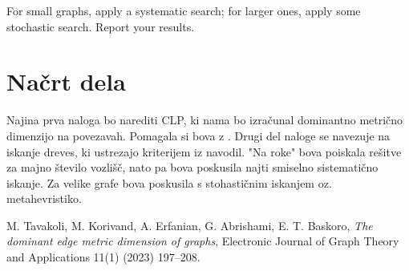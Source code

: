 \documentclass[a4paper,12pt]{article}
\begin{document}
    For small graphs, apply a systematic search; for larger ones, apply some stochastic search. Report your results.

\section{Načrt dela}
    Najina prva naloga bo narediti CLP, ki nama bo izračunal dominantno metrično dimenzijo na povezavah. Pomagala si bova z \cite{dominantedge}. Drugi del naloge se navezuje na iskanje dreves, ki ustrezajo kriterijem iz navodil. "Na roke" bova poiskala rešitve za majno število vozlišč, nato pa bova poskusila najti smiselno sistematično iskanje. Za velike grafe bova poskusila s stohastičnim iskanjem oz. metahevristiko.




    \begin{thebibliography}{99}
        M. Tavakoli, M. Korivand, A. Erfanian, G. Abrishami, E. T. Baskoro,
        \emph{The dominant edge metric dimension of graphs},
        Electronic Journal of Graph Theory and Applications 11(1) (2023) 197–208.  
    \end{thebibliography}
\end{document}
